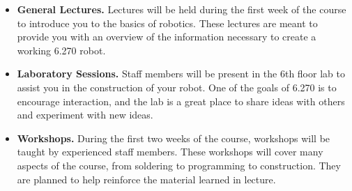 \begin{itemize}
\item {\bf General Lectures.}  Lectures will be held during the first week of
the course to introduce you to the basics of robotics. These lectures are meant
to provide you with an overview of the information necessary to create a working
6.270 robot.

\item {\bf Laboratory Sessions.}  Staff members will be present in the 6th floor
lab to assist you in the construction of your robot.  One of the goals of 6.270
is to encourage interaction, and the lab is a great place to share ideas with
others and experiment with new ideas.

\item {\bf Workshops.}  During the first two weeks of the course, workshops will
be taught by experienced staff members. These workshops will cover many aspects
of the course, from soldering to programming to construction. They are planned
to help reinforce the material learned in lecture.

\end{itemize}

